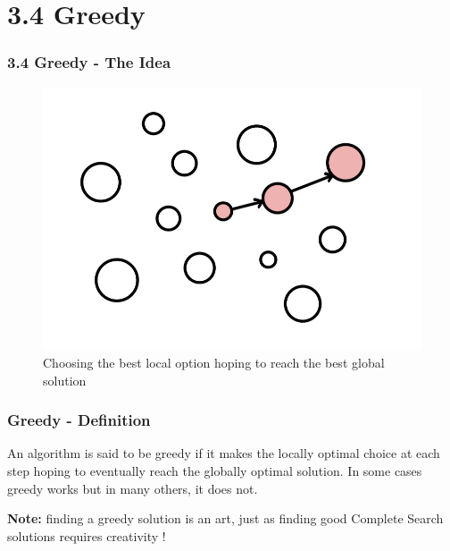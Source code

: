 \documentclass{beamer}
\begin{document}
\section{3.4 Greedy}
\begin{frame}[fragile]
\frametitle{3.4 Greedy - The Idea}

\begin{figure}
    \centering
    \includegraphics[scale=0.25]{imgs/greedy.jpeg}
    \caption{Choosing the best local option hoping to reach the best global solution}
\end{figure}

\end{frame}

\begin{frame}[fragile]
\frametitle{Greedy - Definition}

An algorithm is said to be \color{blue}greedy \color{black} if it makes the locally optimal choice at each step hoping to eventually reach the globally optimal solution. In some cases greedy works but in many others, it does not. \\

\vspace{0.3cm}

\color{blue}\textbf{Note:} finding a greedy solution is an art, just as finding good Complete Search solutions requires creativity !\color{black}

\end{frame}
\end{document}
